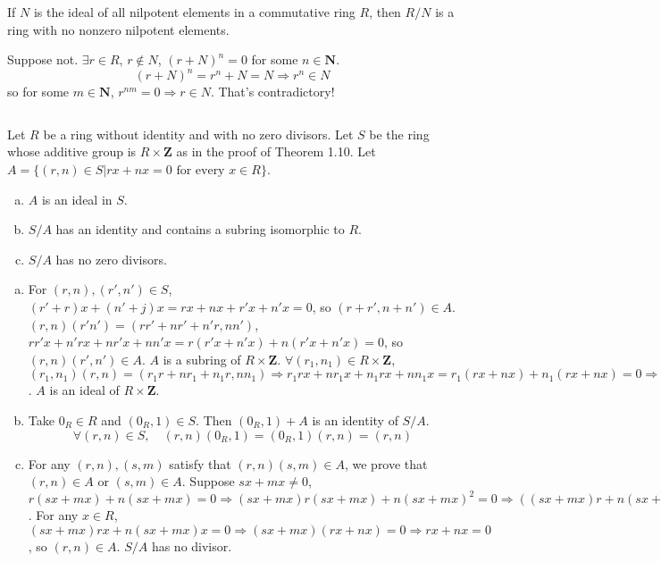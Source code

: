 $$ $$

\begin{ex}
    If $N$ is the ideal of all nilpotent elements in a commutative ring $R$, then $R /N$ is a ring with no nonzero nilpotent elements.
\end{ex}

\begin{answer}
    Suppose not. $\exists r\in R$, $r\notin N$, $(r+N)^{n}=0$ for some $n\in\mathbf{N}$. \[(r+N)^{n}=r^{n}+N=N\Rightarrow r^{n}\in N\]so for some $m\in \mathbf{N}$, $r^{nm}=0\Rightarrow r\in N$. That's contradictory!
\end{answer}

$$ $$

\begin{ex}
    Let $R$ be a ring without identity and with no zero divisors. Let $S$ be the ring whose additive group is $R\times \mathbf{Z}$ as in the proof of Theorem 1.10. Let $A=\{(r,n)\in S|rx+nx=0 \text{ for every }x\in R\}$.
    \begin{enumerate}[(a)]
        \item $A$ is an ideal in $S$.
        \item $S /A$ has an identity and contains a subring isomorphic to $R$.
        \item $S /A$ has no zero divisors.
    \end{enumerate}
\end{ex}

\begin{answer}
    \begin{enumerate}[(a)]
        \item For $(r,n), (r',n')\in S$, $(r'+r)x+(n'+j)x=rx+nx+r'x+n'x=0$, so $(r+r',n+n')\in A$. $(r,n)(r'n')=(rr'+nr'+n'r,nn')$, $rr'x+n'rx+nr'x+nn'x=r(r'x+n'x)+n(r'x+n'x)=0$, so $(r,n)(r',n')\in A$. $A$ is a subring of $R\times \mathbf{Z}$. $\forall (r_{1},n_{1})\in R\times \mathbf{Z}$, $(r_{1},n_{1})(r,n)=(r_{1}r+nr_{1}+n_{1}r,nn_{1})\Rightarrow r_{1}rx+nr_{1}x+n_{1}rx+nn_{1}x=r_{1}(rx+nx)+n_{1}(rx+nx)=0\Rightarrow (r_{1},n_{1})(r,n)\in A$. $A$ is an ideal of $R\times \mathbf{Z}$.
        \item Take $0_{R}\in R$ and $(0_{R},1)\in S$. Then $(0_{R},1)+A$ is an identity of $S /A$. \[\forall (r,n)\in S, \quad (r,n)(0_{R},1)=(0_{R},1)(r,n)=(r,n)\]
        \item For any $(r,n), (s,m)$ satisfy that $(r,n)(s,m)\in A$, we prove that $(r,n)\in A$ or $(s,m)\in A$. Suppose $sx+mx\neq 0$, $r(sx+mx)+n(sx+mx)=0\Rightarrow (sx+mx)r(sx+mx)+n(sx+mx)^{2}=0\Rightarrow ((sx+mx)r+n(sx+mx))(sx+mx)=0\Rightarrow (sx+mx)r+n(sx+mx)=0$. For any $x\in R$, $(sx+mx)rx+n(sx+mx)x=0\Rightarrow(sx+mx)(rx+nx)=0\Rightarrow rx+nx=0$, so $(r,n)\in A$. $S /A$ has no divisor.
    \end{enumerate}
\end{answer}

